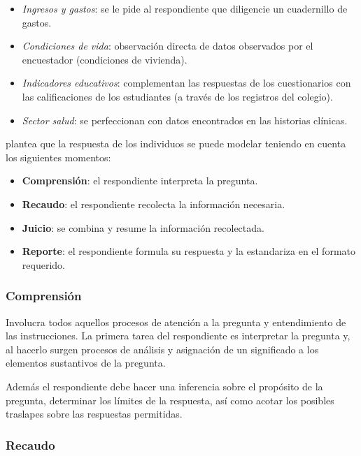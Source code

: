 \documentclass[
  10pt,
  spanish,
]{book}
\providecommand{\tightlist}{%
  \setlength{\itemsep}{0pt}\setlength{\parskip}{0pt}}
\begin{document}
\begin{itemize}
\tightlist
\item
  \emph{Ingresos y gastos}: se le pide al respondiente que diligencie un cuadernillo de gastos.
\item
  \emph{Condiciones de vida}: observación directa de datos observados por el encuestador (condiciones de vivienda).
\item
  \emph{Indicadores educativos}: complementan las respuestas de los cuestionarios con las calificaciones de los estudiantes (a través de los registros del colegio).
\item
  \emph{Sector salud}: se perfeccionan con datos encontrados en las historias clínicas.
\end{itemize}

\citet{Krosnick1999} plantea que la respuesta de los individuos se puede modelar teniendo en cuenta los siguientes momentos:

\begin{itemize}
\tightlist
\item
  \textbf{Comprensión}: el respondiente interpreta la pregunta.
\item
  \textbf{Recaudo}: el respondiente recolecta la información necesaria.
\item
  \textbf{Juicio}: se combina y resume la información recolectada.
\item
  \textbf{Reporte}: el respondiente formula su respuesta y la estandariza en el formato requerido.
\end{itemize}

\hypertarget{comprensiuxf3n}{%
\subsubsection*{Comprensión}\label{comprensiuxf3n}}

Involucra todos aquellos procesos de atención a la pregunta y entendimiento de las instrucciones. La primera tarea del respondiente es interpretar la pregunta y, al hacerlo surgen procesos de análisis y asignación de un significado a los elementos sustantivos de la pregunta.

Además el respondiente debe hacer una inferencia sobre el propósito de la pregunta, determinar los límites de la respuesta, así como acotar los posibles traslapes sobre las respuestas permitidas.

\hypertarget{recaudo}{%
\subsubsection*{Recaudo}\label{recaudo}}
\end{document}

